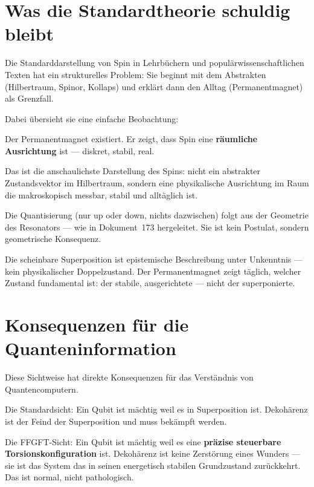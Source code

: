 \section{Was die Standardtheorie schuldig bleibt}
\label{sec:schuldig}

Die Standarddarstellung von Spin in Lehrbüchern und
populärwissenschaftlichen Texten hat ein strukturelles Problem:
Sie beginnt mit dem Abstrakten (Hilbertraum, Spinor, Kollaps)
und erklärt dann den Alltag (Permanentmagnet) als Grenzfall.

Dabei übersieht sie eine einfache Beobachtung:

\begin{significance}
Der Permanentmagnet existiert.
Er zeigt, dass Spin eine \textbf{räumliche Ausrichtung} ist ---
diskret, stabil, real.

Das ist die anschaulichste Darstellung des Spins:
nicht ein abstrakter Zustandsvektor im Hilbertraum,
sondern eine physikalische Ausrichtung im Raum
die makroskopisch messbar, stabil und alltäglich ist.

Die Quantisierung (nur up oder down, nichts dazwischen)
folgt aus der Geometrie des Resonators --- wie in Dokument~173
hergeleitet. Sie ist kein Postulat, sondern geometrische Konsequenz.

Die scheinbare Superposition ist epistemische Beschreibung
unter Unkenntnis --- kein physikalischer Doppelzustand.
Der Permanentmagnet zeigt täglich, welcher Zustand fundamental ist:
der stabile, ausgerichtete --- nicht der superponierte.
\end{significance}

\section{Konsequenzen für die Quanteninformation}
\label{sec:qi-konsequenzen}

Diese Sichtweise hat direkte Konsequenzen für das Verständnis
von Quantencomputern.

Die Standardsicht: Ein Qubit ist mächtig weil es in Superposition ist.
Dekohärenz ist der Feind der Superposition und muss bekämpft werden.

Die FFGFT-Sicht: Ein Qubit ist mächtig weil es eine
\textbf{präzise steuerbare Torsionskonfiguration} ist.
Dekohärenz ist keine Zerstörung eines Wunders ---
sie ist das System das in seinen energetisch stabilen
Grundzustand zurückkehrt. Das ist normal, nicht pathologisch.

